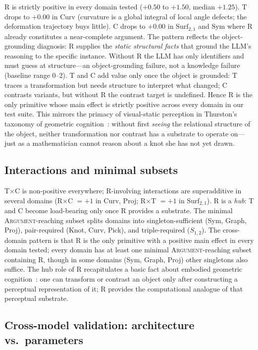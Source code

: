 \documentclass{article}
\begin{document}
R is strictly positive in every domain tested ($+0.50$ to $+1.50$, median $+1.25$). T drops
to $+0.00$ in $\mathrm{Curv}$ (curvature is a global integral of local angle defects;
the deformation trajectory buys little). C drops to $+0.00$ in $\mathrm{Surf}_{2,1}$
and $\mathrm{Sym}$ where R already constitutes a near-complete argument. The pattern reflects the object-grounding diagnosis: R supplies the
\emph{static structural facts} that ground the LLM's reasoning to the specific
instance. Without R the LLM has only identifiers and must guess at structure---an
object-grounding failure, not a knowledge failure (baseline range $0$--$2$). T
and C add value only once the object is grounded: T traces a transformation but
needs structure to interpret what changed; C contrasts variants, but without R
the contrast target is undefined. Hence R is the only primitive whose main
effect is strictly positive across every domain in our test suite. This mirrors
the primacy of visual-static perception in Thurston's taxonomy of geometric
cognition~\citep{thurston1994proof}: without first \emph{seeing} the relational
structure of the object, neither transformation nor contrast has a substrate to
operate on---just as a mathematician cannot reason about a knot she has not yet
drawn.

\subsection{Interactions and minimal subsets}
T$\times$C is non-positive everywhere; R-involving interactions are
superadditive in several domains (R$\times$C $=+1$ in Curv, Proj;
R$\times$T $=+1$ in $\mathrm{Surf}_{2,1}$). R is a \emph{hub}: T and C
become load-bearing only once R provides a substrate. The minimal
\textsc{Argument}-reaching subset splits domains into singleton-sufficient
(Sym, Graph, Proj), pair-required (Knot, Curv, Pick), and triple-required
($S_{1,2}$). The cross-domain pattern is that R is the only primitive with a
positive main effect in every domain tested; every domain has at least one
minimal \textsc{Argument}-reaching subset containing R, though in some
domains (Sym, Graph, Proj) other singletons also suffice. The hub role of R
recapitulates a basic fact about embodied geometric
cognition~\citep{lakoff2000mathematics}: one can transform or contrast an
object only after constructing a perceptual representation of it; R provides
the computational analogue of that perceptual substrate.

\subsection{Cross-model validation: architecture vs.\ parameters}
\label{sec:cross-model}
\end{document}
